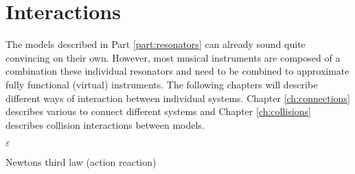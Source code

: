 \chapter*{Interactions}
The models described in Part \ref{part:resonators} can already sound quite convincing on their own. However, most musical instruments are composed of a combination these individual resonators and need to be combined to approximate fully functional (virtual) instruments. The following chapters will describe different ways of interaction between individual systems. Chapter \ref{ch:connections} describes various to connect different systems and Chapter \ref{ch:collisions} describes collision interactions between models. 


$\varepsilon$

Newtons third law (action reaction)
